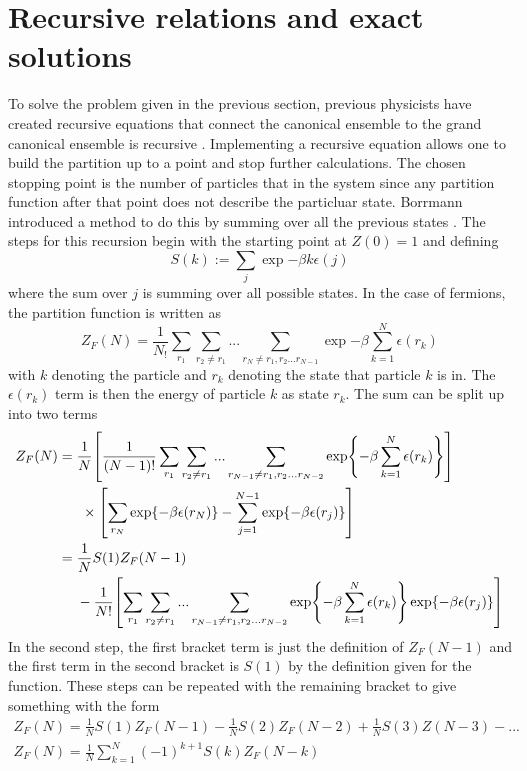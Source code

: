 \section{Recursive relations and exact solutions}
To solve the problem given in the previous section, previous physicists have created recursive equations that connect the canonical ensemble to the grand canonical ensemble is recursive \cite{Borr1993} \cite{Schon1996} \cite{Hatem2020}. Implementing a recursive equation allows one to build the partition up to a point and stop further calculations. The chosen stopping point is the number of particles that in the system since any partition function after that point does not describe the particluar state. Borrmann introduced a method to do this by summing over all the previous states \cite{Borr1993}. The steps for this recursion begin with the starting point at $Z(0)=1$ and defining 
\begin{equation}
    S(k):=\sum_j \exp{-\beta k \epsilon(j)}
\end{equation}
where the sum over $j$ is summing over all possible states. In the case of fermions, the partition function is written as
\begin{equation}
    Z_F(N)=\frac{1}{N_!}\sum_{r_1}\sum_{r_2\neq r_1}...\sum_{r_N\neq r_1,r_2...r_{N-1}} \exp{-\beta \sum_{k=1}^N \epsilon(r_k)}
\end{equation}
with $k$ denoting the particle and $r_k$ denoting the state that particle $k$ is in. The $\epsilon(r_k)$ term is then the energy of particle $k$ as state $r_k$. The sum can be split up into two terms
\begin{align}
    Z_F(N)&=\frac{1}{N}\qty[\frac{1}{(N-1)!} \sum_{r_1}\sum_{r_2\neq r_1}...\sum_{r_{N-1}\neq r_1,r_2...r_{N-2}} \exp{-\beta \sum_{k=1}^N \epsilon(r_k)}] \nonumber\\&\ \ \ \ \ \times \qty[\sum_{r_N}\exp{-\beta\epsilon(r_N)}-\sum_{j=1}^{N-1}\exp{-\beta\epsilon(r_j)}]\nonumber \\
   &=\frac{1}{N}S(1)Z_F(N-1)\\
   &\ \ \ \ -\frac{1}{N!}\qty[\sum_{r_1}\sum_{r_2\neq r_1}...\sum_{r_{N-1}\neq r_1,r_2...r_{N-2}} \exp{-\beta \sum_{k=1}^N \epsilon(r_k)} \exp{-\beta \epsilon(r_j)}] \nonumber
\end{align}
In the second step, the first bracket term is just the definition of $Z_F(N-1)$ and the first term in the second bracket is $S(1)$ by the definition given for the function. These steps can be repeated with the remaining bracket to give something with the form \cite{Borr1993}
\begin{gather}
    Z_F(N)=\frac{1}{N}S(1)Z_F(N-1)-\frac{1}{N}S(2)Z_F(N-2)+\frac{1}{N}S(3)Z(N-3)-...\nonumber\\
    Z_F(N)=\frac{1}{N}\sum_{k=1}^N (-1)^{k+1} S(k)Z_F(N-k)
\end{gather}

